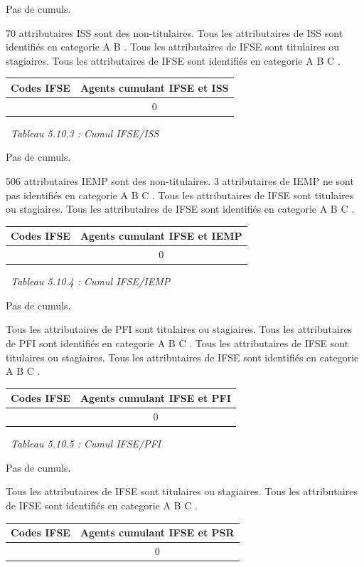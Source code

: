 Pas de cumuls.

70 attributaires ISS sont des non-titulaires. Tous les attributaires de
ISS sont identifiés en categorie A B . Tous les attributaires de IFSE
sont titulaires ou stagiaires. Tous les attributaires de IFSE sont
identifiés en categorie A B C .

\begin{longtable}[]{@{}cc@{}}
\toprule
Codes IFSE & Agents cumulant IFSE et ISS\tabularnewline
\midrule
\endhead
& 0\tabularnewline
\bottomrule
\end{longtable}

~\emph{Tableau 5.10.3 : Cumul IFSE/ISS}

Pas de cumuls.

506 attributaires IEMP sont des non-titulaires. 3 attributaires de IEMP
ne sont pas identifiés en categorie A B C . Tous les attributaires de
IFSE sont titulaires ou stagiaires. Tous les attributaires de IFSE sont
identifiés en categorie A B C .

\begin{longtable}[]{@{}cc@{}}
\toprule
Codes IFSE & Agents cumulant IFSE et IEMP\tabularnewline
\midrule
\endhead
& 0\tabularnewline
\bottomrule
\end{longtable}

~\emph{Tableau 5.10.4 : Cumul IFSE/IEMP}

Pas de cumuls.

Tous les attributaires de PFI sont titulaires ou stagiaires. Tous les
attributaires de PFI sont identifiés en categorie A B C . Tous les
attributaires de IFSE sont titulaires ou stagiaires. Tous les
attributaires de IFSE sont identifiés en categorie A B C .

\begin{longtable}[]{@{}cc@{}}
\toprule
Codes IFSE & Agents cumulant IFSE et PFI\tabularnewline
\midrule
\endhead
& 0\tabularnewline
\bottomrule
\end{longtable}

~\emph{Tableau 5.10.5 : Cumul IFSE/PFI}

Pas de cumuls.

Tous les attributaires de IFSE sont titulaires ou stagiaires. Tous les
attributaires de IFSE sont identifiés en categorie A B C .

\begin{longtable}[]{@{}cc@{}}
\toprule
Codes IFSE & Agents cumulant IFSE et PSR\tabularnewline
\midrule
\endhead
& 0\tabularnewline
\bottomrule
\end{longtable}


